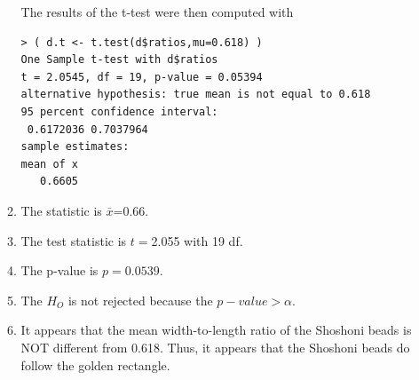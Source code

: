 \documentclass[10pt,openany]{book}\usepackage[]{graphicx}\usepackage[]{color}
\makeatletter
\newenvironment{kframe}{%
 \def\at@end@of@kframe{}%
 \ifinner\ifhmode%
  \def\at@end@of@kframe{\end{minipage}}%
  \begin{minipage}{\columnwidth}%
 \fi\fi%
 \def\FrameCommand##1{\hskip\@totalleftmargin \hskip-\fboxsep
 \colorbox{shadecolor}{##1}\hskip-\fboxsep
     \hskip-\linewidth \hskip-\@totalleftmargin \hskip\columnwidth}%
 \MakeFramed {\advance\hsize-\width
   \@totalleftmargin\z@ \linewidth\hsize
   \@setminipage}}%
 {\par\unskip\endMakeFramed%
 \at@end@of@kframe}
\newenvironment{knitrout}{}{} %
\makeatother
\begin{document}
\begin{itemize}
\begin{enumerate}
\begin{knitrout}
\end{knitrout}
The results of the t-test were then computed with
\begin{knitrout}
\color{fgcolor}\begin{kframe}
\begin{verbatim}
> ( d.t <- t.test(d$ratios,mu=0.618) )
One Sample t-test with d$ratios 
t = 2.0545, df = 19, p-value = 0.05394
alternative hypothesis: true mean is not equal to 0.618 
95 percent confidence interval:
 0.6172036 0.7037964 
sample estimates:
mean of x 
   0.6605 
\end{verbatim}
\end{kframe}
\end{knitrout}
      \item The statistic is $\bar{x}$=0.66.
      \item The test statistic is $t=$2.055 with 19 df.
      \item The p-value is $p=0.0539$.
      \item The $H_{O}$ is not rejected because the $p-value>\alpha$.
      \item It appears that the mean width-to-length ratio of the Shoshoni beads is NOT different from 0.618.  Thus, it appears that the Shoshoni beads do follow the golden rectangle.
    \end{enumerate}


\end{itemize}
\end{document}
